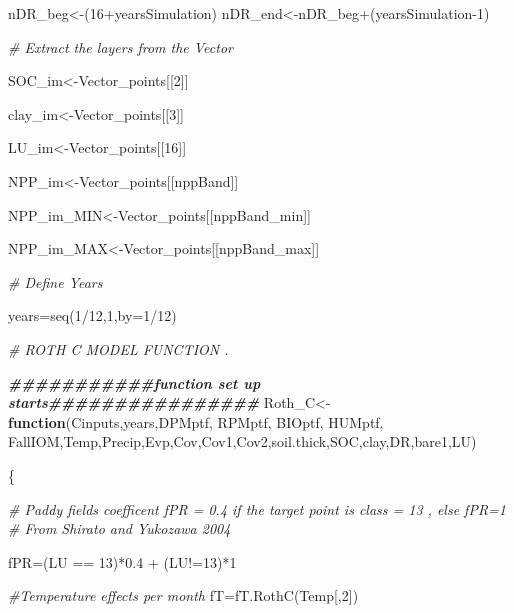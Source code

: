 \documentclass[
  10pt,
  b5paper,
]{book}
\newenvironment{Shaded}{\begin{snugshade}}{\end{snugshade}}
\newcommand{\AttributeTok}[1]{\textcolor[rgb]{0.77,0.63,0.00}{#1}}
\newcommand{\CommentTok}[1]{\textcolor[rgb]{0.56,0.35,0.01}{\textit{#1}}}
\newcommand{\ControlFlowTok}[1]{\textcolor[rgb]{0.13,0.29,0.53}{\textbf{#1}}}
\newcommand{\DecValTok}[1]{\textcolor[rgb]{0.00,0.00,0.81}{#1}}
\newcommand{\DocumentationTok}[1]{\textcolor[rgb]{0.56,0.35,0.01}{\textbf{\textit{#1}}}}
\newcommand{\FloatTok}[1]{\textcolor[rgb]{0.00,0.00,0.81}{#1}}
\newcommand{\FunctionTok}[1]{\textcolor[rgb]{0.00,0.00,0.00}{#1}}
\newcommand{\NormalTok}[1]{#1}
\newcommand{\OtherTok}[1]{\textcolor[rgb]{0.56,0.35,0.01}{#1}}
\newcommand{\SpecialCharTok}[1]{\textcolor[rgb]{0.00,0.00,0.00}{#1}}
\begin{document}
\begin{Shaded}
\begin{Highlighting}[]
\NormalTok{nDR\_beg}\OtherTok{\textless{}{-}}\NormalTok{(}\DecValTok{16}\SpecialCharTok{+}\NormalTok{yearsSimulation)}
\NormalTok{nDR\_end}\OtherTok{\textless{}{-}}\NormalTok{nDR\_beg}\SpecialCharTok{+}\NormalTok{(yearsSimulation}\DecValTok{{-}1}\NormalTok{)}

\CommentTok{\# Extract the layers from the Vector}

\NormalTok{SOC\_im}\OtherTok{\textless{}{-}}\NormalTok{Vector\_points[[}\DecValTok{2}\NormalTok{]] }

\NormalTok{clay\_im}\OtherTok{\textless{}{-}}\NormalTok{Vector\_points[[}\DecValTok{3}\NormalTok{]] }

\NormalTok{LU\_im}\OtherTok{\textless{}{-}}\NormalTok{Vector\_points[[}\DecValTok{16}\NormalTok{]]}

\NormalTok{NPP\_im}\OtherTok{\textless{}{-}}\NormalTok{Vector\_points[[nppBand]]}

\NormalTok{NPP\_im\_MIN}\OtherTok{\textless{}{-}}\NormalTok{Vector\_points[[nppBand\_min]]}

\NormalTok{NPP\_im\_MAX}\OtherTok{\textless{}{-}}\NormalTok{Vector\_points[[nppBand\_max]]}

\CommentTok{\# Define Years}

\NormalTok{years}\OtherTok{=}\FunctionTok{seq}\NormalTok{(}\DecValTok{1}\SpecialCharTok{/}\DecValTok{12}\NormalTok{,}\DecValTok{1}\NormalTok{,}\AttributeTok{by=}\DecValTok{1}\SpecialCharTok{/}\DecValTok{12}\NormalTok{)}


\CommentTok{\# ROTH C MODEL FUNCTION . }

\DocumentationTok{\#\#\#\#\#\#\#\#\#\#\#function set up starts\#\#\#\#\#\#\#\#\#\#\#\#\#\#\#\#}
\NormalTok{Roth\_C}\OtherTok{\textless{}{-}}\ControlFlowTok{function}\NormalTok{(Cinputs,years,DPMptf, RPMptf, BIOptf, HUMptf, FallIOM,Temp,Precip,Evp,Cov,Cov1,Cov2,soil.thick,SOC,clay,DR,bare1,LU)}

\NormalTok{\{}

\CommentTok{\# Paddy fields coefficent fPR = 0.4 if the target point is class = 13 , else fPR=1}
\CommentTok{\# From Shirato and Yukozawa 2004}

\NormalTok{fPR}\OtherTok{=}\NormalTok{(LU }\SpecialCharTok{==} \DecValTok{13}\NormalTok{)}\SpecialCharTok{*}\FloatTok{0.4} \SpecialCharTok{+}\NormalTok{ (LU}\SpecialCharTok{!=}\DecValTok{13}\NormalTok{)}\SpecialCharTok{*}\DecValTok{1}

\CommentTok{\#Temperature effects per month}
\NormalTok{fT}\OtherTok{=}\FunctionTok{fT.RothC}\NormalTok{(Temp[,}\DecValTok{2}\NormalTok{]) }


\end{Highlighting}
\end{Shaded}
\end{document}

